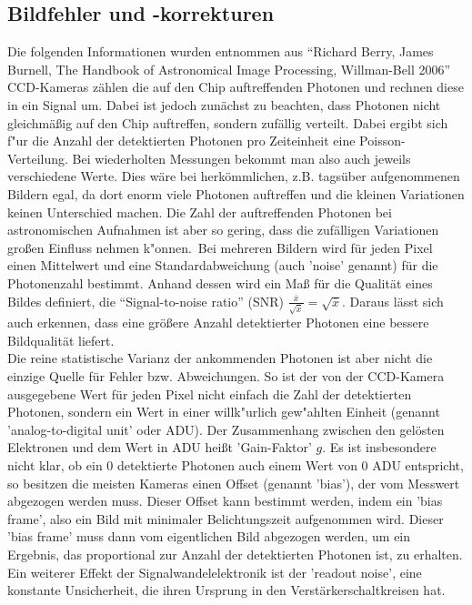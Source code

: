 \subsection{Bildfehler und -korrekturen}
Die folgenden Informationen wurden entnommen aus \enquote{Richard Berry, James Burnell, The Handbook of Astronomical Image Processing, Willman-Bell 2006}
CCD-Kameras zählen die auf den Chip auftreffenden Photonen und rechnen diese in ein Signal um. Dabei ist jedoch zunächst zu beachten, dass Photonen nicht gleichmäßig auf den Chip auftreffen, sondern zufällig verteilt. Dabei ergibt sich f"ur die Anzahl der detektierten Photonen pro Zeiteinheit eine Poisson-Verteilung. Bei wiederholten Messungen bekommt man also auch jeweils verschiedene Werte. Dies wäre bei herkömmlichen, z.B. tagsüber aufgenommenen Bildern egal, da dort enorm viele Photonen auftreffen und die kleinen Variationen keinen Unterschied machen. Die Zahl der auftreffenden Photonen bei astronomischen Aufnahmen ist aber so gering, dass die zufälligen Variationen großen Einfluss nehmen k"onnen.\
Bei mehreren Bildern wird für jeden Pixel einen Mittelwert und eine Standardabweichung (auch 'noise' genannt) für die Photonenzahl bestimmt. Anhand dessen wird ein Maß für die Qualität eines Bildes definiert, die \enquote{Signal-to-noise ratio} (SNR) $\frac{\overline{x}}{\sqrt{\overline{x}}} = \sqrt{\overline{x}}$.  Daraus lässt sich auch erkennen, dass eine größere Anzahl detektierter Photonen eine bessere Bildqualität liefert.\\
Die reine statistische Varianz der ankommenden Photonen ist aber nicht die einzige Quelle für Fehler bzw. Abweichungen. So ist der von der CCD-Kamera ausgegebene Wert für jeden Pixel nicht einfach die Zahl der detektierten Photonen, sondern ein Wert in einer willk"urlich gew"ahlten Einheit (genannt 'analog-to-digital unit' oder ADU). Der Zusammenhang zwischen den gelösten Elektronen und dem Wert in ADU heißt 'Gain-Faktor' $g$. Es ist insbesondere nicht klar, ob ein 0 detektierte Photonen auch einem Wert von 0 ADU entspricht, so besitzen die meisten Kameras einen Offset (genannt 'bias'), der vom Messwert abgezogen werden muss. Dieser Offset kann bestimmt werden, indem ein 'bias frame', also ein Bild mit minimaler Belichtungszeit aufgenommen wird. Dieser 'bias frame' muss dann vom eigentlichen Bild abgezogen werden, um ein Ergebnis, das proportional zur Anzahl der detektierten Photonen ist, zu erhalten. Ein weiterer Effekt der Signalwandelelektronik ist der 'readout noise', eine konstante Unsicherheit, die ihren Ursprung in den Verstärkerschaltkreisen hat.

